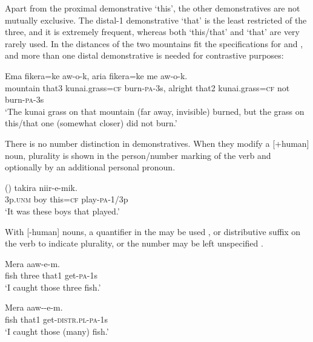 
Apart from the proximal demonstrative  `this', the other demonstratives are not mutually exclusive. The distal-1 demonstrative  `that' is the least restricted of the three, and it is extremely frequent, whereas both  `this/that' and  `that' are very rarely used. In  the distances of the two mountains fit the specifications for  and  , and more than one distal demonstrative is needed for contrastive purposes:

\ea%
\label{ex:3:x1749}
\gll Ema  fikera=ke aw-o-k, aria  fikera=ke me aw-o-k.\\
mountain that3 kunai.grass=\textsc{cf} burn-\textsc{pa}-3s, alright that2 kunai.grass=\textsc{cf} not burn-\textsc{pa}-3s\\
\glt`The kunai grass on that mountain (far away, invisible) burned, but the grass on this/that one (somewhat closer) did not burn.'
\z

There is no number distinction in demonstratives. When they modify a [+human] noun, plurality is shown in the person/number marking of the verb and optionally by an additional personal pronoun.

\ea%
\label{ex:3:x635}
\gll () takira  niir-e-mik. \\
3p.\textsc{unm} boy this=\textsc{cf} play-\textsc{pa}-1/3p\\
\glt`It was these boys that played.'
\z

With [-human] nouns, a quantifier in the  may be used , or distributive suffix on the verb  to indicate plurality, or the number may be left unspecified .

\ea%
\label{ex:3:x636}
\gll Mera   aaw-e-m. \\
fish three that1 get-\textsc{pa}-1s\\
\glt`I caught those three fish.'
\z

\ea%
\label{ex:3:x637}
\gll Mera  aaw--e-m. \\
fish that1 get-\textsc{distr}.\textsc{pl}-\textsc{pa}-1s\\
\glt`I caught those (many) fish.'
\z

